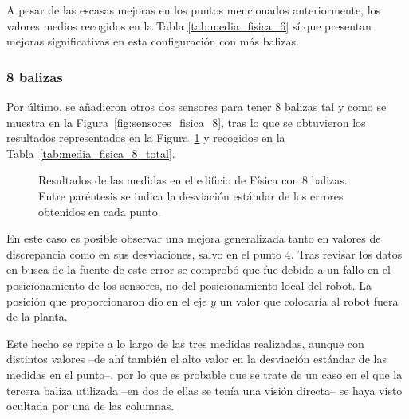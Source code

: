 A pesar de las escasas mejoras en los puntos mencionados anteriormente, los valores medios recogidos en la Tabla \ref{tab:media_fisica_6} sí que presentan mejoras significativas en esta configuración con más balizas.

\subsubsection{8 balizas}

Por último, se añadieron otros dos sensores para tener 8 balizas tal y como se muestra en la Figura~\ref{fig:sensores_fisica_8}, tras lo que se obtuvieron los resultados representados en la Figura~\ref{fig:res_fisica_8} y recogidos en la Tabla~\ref{tab:media_fisica_8_total}.
\begin{figure}[H]
    \centering
    
    \caption{Resultados de las medidas en el edificio de Física con 8 balizas. Entre paréntesis se indica la desviación estándar de los errores obtenidos en cada punto.}
    \label{fig:res_fisica_8}
\end{figure}

En este caso es posible observar una mejora generalizada tanto en valores de discrepancia como en sus desviaciones, salvo en el punto 4.
Tras revisar los datos en busca de la fuente de este error se comprobó que fue debido a un fallo en el posicionamiento de los sensores, no del posicionamiento local del robot.
La posición que proporcionaron dio en el eje $y$ un valor que colocaría al robot fuera de la planta.

Este hecho se repite a lo largo de las tres medidas realizadas, aunque con distintos valores --de ahí también el alto valor en la desviación estándar de las medidas en el punto--, por lo que es probable que se trate de un caso en el que la tercera baliza utilizada --en dos de ellas se tenía una visión directa-- se haya visto ocultada por una de las columnas.

